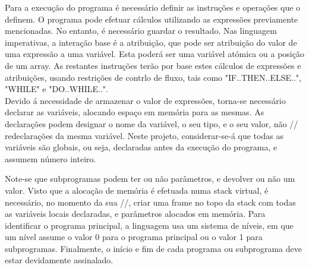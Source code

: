 Para a execução do programa é necessário definir as instruções e operações que
o definem. O programa pode efetuar cálculos utilizando as expressões previamente
mencionadas. No entanto, é necessário guardar o resultado. Nas linguagem imperativas, 
a interação base é a atribuição, que pode ser atribuição do valor de uma expressão 
a uma variável. Esta poderá ser uma variável atómica ou a posição de um array. 
As restantes instruções terão por base estes cálculos de expressões e atribuições, 
usando restrições de contrlo de fluxo, tais como "IF..THEN..ELSE..", "WHILE" 
e "DO..WHILE..".\\

Devido á necessidade de armazenar o valor de expressões, torna-se necessário 
declarar as variáveis, alocando espaço em memória para as mesmas. As declarações 
podem designar o nome da variável, o seu tipo, e o seu valor, não // redeclarações 
da mesma variável. Neste projeto, considerar-se-á que todas as variáveis são globais, 
ou seja, declaradas antes da execução do programa, e assumem número inteiro.   

Note-se que subprogramas podem ter ou não parâmetros,
e devolver ou não um valor. Visto que a alocação de memória é efetuada numa
stack virtual, é necessário, no momento da sua //, criar uma frame no topo da
stack com todas as variáveis locais declaradas, e parâmetros alocados em
memória. Para identificar o programa principal, a linguagem usa um sistema de
níveis, em que um nível assume o valor 0 para o programa principal ou o valor
1 para subprogramas. Finalmente, o início e fim de cada programa ou subprograma
deve estar devidamente assinalado.  

 
 
 



 



